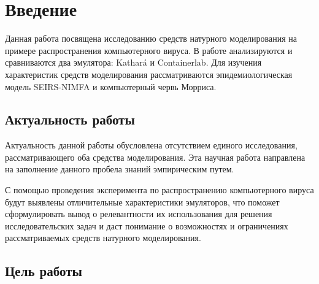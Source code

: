 \documentclass[
  english,
  russian,
  12pt,
  a4paper,
]{phdthesr}
\renewcommand*\contentsname{Содержание}
\newcommand\contentsname{Содержание}
\begin{document}

\makeatother


\renewcommand*\contentsname{Содержание}
{
\setcounter{tocdepth}{1}
\tableofcontents
}


\chapter*{Введение}\label{ux432ux432ux435ux434ux435ux43dux438ux435}


Данная работа посвящена исследованию средств натурного моделирования на
примере распространения компьютерного вируса. В работе анализируются и
сравниваются два эмулятора: Kathará и Containerlab. Для изучения
характеристик средств моделирования рассматриваются эпидемиологическая
модель SEIRS-NIMFA и компьютерный червь Морриса.

\section*{Актуальность
работы}\label{ux430ux43aux442ux443ux430ux43bux44cux43dux43eux441ux442ux44c-ux440ux430ux431ux43eux442ux44b}


Актуальность данной работы обусловлена отсутствием единого исследования,
рассматривающего оба средства моделирования. Эта научная работа
направлена на заполнение данного пробела знаний эмпирическим путем.

С помощью проведения эксперимента по распространению компьютерного
вируса будут выявлены отличительные характеристики эмуляторов, что
поможет сформулировать вывод о релевантности их использования для
решения исследовательских задач и даст понимание о возможностях и
ограничениях рассматриваемых средств натурного моделирования.

\section*{Цель
работы}\label{ux446ux435ux43bux44c-ux440ux430ux431ux43eux442ux44b}
\end{document}
